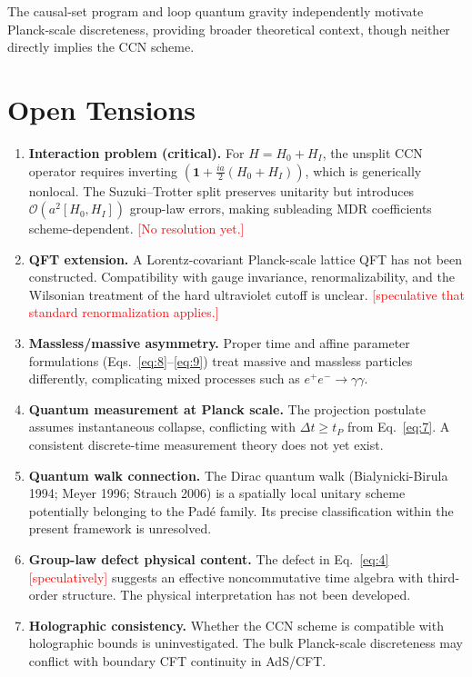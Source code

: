 \documentclass[11pt,a4paper]{article}
\begin{document}
The causal-set program \cite{henson2006} and loop quantum gravity \cite{ashtekar2004,thiemann1996} independently motivate Planck-scale discreteness, providing broader theoretical context, though neither directly implies the CCN scheme.

\section{Open Tensions}

\begin{enumerate}
  \item \textbf{Interaction problem (critical).} For $H = H_0 + H_I$, the unsplit CCN operator requires inverting $(\mathbf{1} + \tfrac{ia}{2}(H_0+H_I))$, which is generically nonlocal. The Suzuki--Trotter split preserves unitarity but introduces $\mathcal{O}(a^2[H_0,H_I])$ group-law errors, making subleading MDR coefficients scheme-dependent. \textcolor{red}{[No resolution yet.]}

  \item \textbf{QFT extension.} A Lorentz-covariant Planck-scale lattice QFT has not been constructed. Compatibility with gauge invariance, renormalizability, and the Wilsonian treatment of the hard ultraviolet cutoff is unclear. \textcolor{red}{[speculative that standard renormalization applies.]}

  \item \textbf{Massless/massive asymmetry.} Proper time and affine parameter formulations (Eqs.~\eqref{eq:8}--\eqref{eq:9}) treat massive and massless particles differently, complicating mixed processes such as $e^+e^- \to \gamma\gamma$.

  \item \textbf{Quantum measurement at Planck scale.} The projection postulate assumes instantaneous collapse, conflicting with $\Delta t \geq t_P$ from Eq.~\eqref{eq:7}. A consistent discrete-time measurement theory does not yet exist.

  \item \textbf{Quantum walk connection.} The Dirac quantum walk (Bialynicki-Birula 1994; Meyer 1996; Strauch 2006) is a spatially local unitary scheme potentially belonging to the Pad\'{e} family. Its precise classification within the present framework is unresolved.

  \item \textbf{Group-law defect physical content.} The defect in Eq.~\eqref{eq:4} \textcolor{red}{[speculatively]} suggests an effective noncommutative time algebra with third-order structure. The physical interpretation has not been developed.

  \item \textbf{Holographic consistency.} Whether the CCN scheme is compatible with holographic bounds \cite{maldacena1997,witten1998,skenderis2002} is uninvestigated. The bulk Planck-scale discreteness may conflict with boundary CFT continuity in AdS/CFT.
\end{enumerate}
\end{document}
